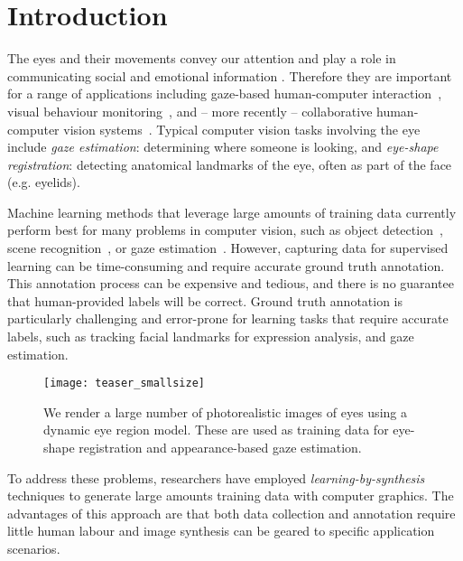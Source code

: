 
\section{Introduction}

The eyes and their movements convey our attention and play a role in communicating social and emotional information \cite{Argyle1965}.
Therefore they are important for a range of applications including gaze-based human-computer interaction~\cite{majaranta14_apc}, visual behaviour monitoring~\cite{bulling11_pami}, and -- more recently -- collaborative human-computer vision systems~\cite{yun2013studying,papadopoulos2014training,sattar15_cvpr}. 
Typical computer vision tasks involving the eye include \emph{gaze estimation}: determining where someone is looking, and \emph{eye-shape registration}: detecting anatomical landmarks of the eye, often as part of the face (e.g. eyelids).

Machine learning methods that leverage large amounts of training data currently perform best for many problems in computer vision, such as object detection~\cite{girshick2014rich}, scene recognition~\cite{zhou2014learning}, or gaze estimation~\cite{zhang15_cvpr}.
However, capturing data for supervised learning can be time-consuming and require accurate ground truth annotation.
This annotation process can be expensive and tedious, and there is no guarantee that human-provided labels will be correct.
Ground truth annotation is particularly challenging and error-prone for learning tasks that require accurate labels, such as tracking facial landmarks for expression analysis, and gaze estimation.

\begin{figure}
    \texttt{[image: teaser\_smallsize]}
    \caption{We render a large number of photorealistic images of eyes using a dynamic eye region model. These are used as training data for eye-shape registration and appearance-based gaze estimation.}
    \label{fig:teaser}
\end{figure}

To address these problems, researchers have employed \emph{learning-by-synthesis} techniques to generate large amounts training data with computer graphics.
The advantages of this approach are that both data collection and annotation require little human labour and image synthesis can be geared to specific application scenarios.

